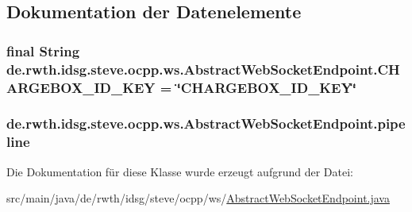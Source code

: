 \subsection{Dokumentation der Datenelemente}
\hypertarget{classde_1_1rwth_1_1idsg_1_1steve_1_1ocpp_1_1ws_1_1_abstract_web_socket_endpoint_a4ebea42decdb880f9f3a8a33e73cf4e7}{
\subsubsection[{C\+H\+A\+R\+G\+E\+B\+O\+X\+\_\+\+I\+D\+\_\+\+K\+E\+Y}]{\setlength{\rightskip}{0pt plus 5cm}final String de.\+rwth.\+idsg.\+steve.\+ocpp.\+ws.\+Abstract\+Web\+Socket\+Endpoint.\+C\+H\+A\+R\+G\+E\+B\+O\+X\+\_\+\+I\+D\+\_\+\+K\+E\+Y = \char`\"{}C\+H\+A\+R\+G\+E\+B\+O\+X\+\_\+\+I\+D\+\_\+\+K\+E\+Y\char`\"{}\hspace{0.3cm}{\ttfamily [static]}}}\label{classde_1_1rwth_1_1idsg_1_1steve_1_1ocpp_1_1ws_1_1_abstract_web_socket_endpoint_a4ebea42decdb880f9f3a8a33e73cf4e7}
\hypertarget{classde_1_1rwth_1_1idsg_1_1steve_1_1ocpp_1_1ws_1_1_abstract_web_socket_endpoint_ad702702e9550fea4384b0b0e8dbf05ff}{
\subsubsection[{pipeline}]{ de.\+rwth.\+idsg.\+steve.\+ocpp.\+ws.\+Abstract\+Web\+Socket\+Endpoint.\+pipeline\hspace{0.3cm}{\ttfamily [protected]}}}\label{classde_1_1rwth_1_1idsg_1_1steve_1_1ocpp_1_1ws_1_1_abstract_web_socket_endpoint_ad702702e9550fea4384b0b0e8dbf05ff}


Die Dokumentation für diese Klasse wurde erzeugt aufgrund der Datei\+:\begin{DoxyCompactItemize}
\item 
src/main/java/de/rwth/idsg/steve/ocpp/ws/\hyperlink{_abstract_web_socket_endpoint_8java}{Abstract\+Web\+Socket\+Endpoint.\+java}\end{DoxyCompactItemize}
